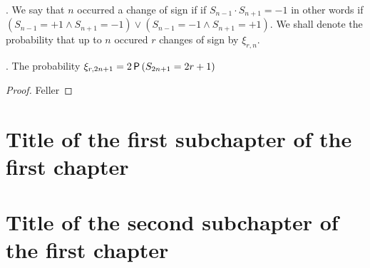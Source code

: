 \begin{defn}
  \Lrw. We say that \intime $n$ occurred a change of sign if if $S_{n-1}\cdot S_{n+1}=-1$ in other words if $\left(S_{n-1}=+1 \land S_{n+1}=-1\right) \lor \left(S_{n-1}=-1 \land S_{n+1}=+1\right).$ We shall denote the probability that up to \time $n$ occured $r$ changes of sign by $\xi_{r, n}$.
\end{defn}
\begin{thm}
  \Lrws. The probability $\xi_{r,2n+1}=2\operatorname{\textsf{P}}\left( S_{2n+1}=2r+1 \right)$
\end{thm}
\begin{proof}
  Feller
\end{proof}



\section{Title of the first subchapter of the first chapter}

\section{Title of the second subchapter of the first chapter}
